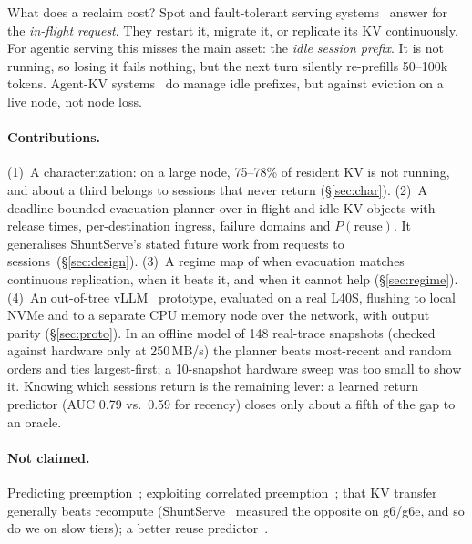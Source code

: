 \documentclass[10pt,twocolumn]{article}
\begin{document}
What does a reclaim cost? Spot and fault-tolerant serving
systems~\cite{spotserve,shuntserve,kevlarflow,lumen,ghostserve} answer for the
\emph{in-flight request}. They restart it, migrate it, or replicate its KV
continuously. For agentic serving this misses the main asset: the \emph{idle session
prefix}. It is not running, so losing it fails nothing, but the next turn silently
re-prefills 50--100k tokens. Agent-KV systems~\cite{continuum,cachescout,kvflow} do
manage idle prefixes, but against eviction on a live node, not node loss.

\paragraph{Contributions.}
(1)~A characterization: on a large node, 75--78\% of resident KV is not running, and
about a third belongs to sessions that never return (\S\ref{sec:char}).
(2)~A deadline-bounded evacuation planner over in-flight and idle KV objects with
release times, per-destination ingress, failure domains and $P(\text{reuse})$. It
generalises ShuntServe's stated future work from requests to
sessions~(\S\ref{sec:design}).
(3)~A regime map of when evacuation matches continuous replication, when it beats it,
and when it cannot help (\S\ref{sec:regime}).
(4)~An out-of-tree vLLM~\cite{vllm} prototype, evaluated on a real L40S, flushing to
local NVMe and to a separate CPU memory node over the network, with output parity
(\S\ref{sec:proto}). In an offline model of 148 real-trace snapshots (checked against
hardware only at 250\,MB/s) the planner beats most-recent and random orders and ties
largest-first; a 10-snapshot hardware sweep was too small to show it. Knowing which sessions return is the remaining lever: a learned return predictor
(AUC 0.79 vs.\ 0.59 for recency) closes only about a fifth of the gap to an oracle.

\paragraph{Not claimed.} Predicting preemption~\cite{parcae,skynomad,hazardserve};
exploiting correlated preemption~\cite{skyserve}; that KV transfer generally beats
recompute (ShuntServe~\cite{shuntserve} measured the opposite on g6/g6e, and so do we
on slow tiers); a better reuse predictor~\cite{cachescout,continuum}.
\end{document}
